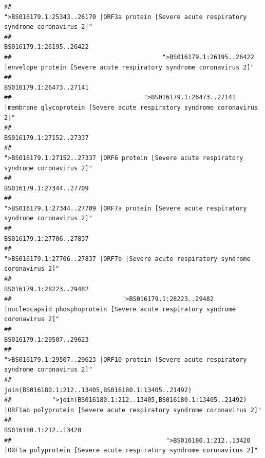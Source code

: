\documentclass[
]{article}
\begin{document}
\begin{verbatim}
##                                            ">BS016179.1:25343..26170 |ORF3a protein [Severe acute respiratory syndrome coronavirus 2]" 
##                                                                                                                BS016179.1:26195..26422 
##                                         ">BS016179.1:26195..26422 |envelope protein [Severe acute respiratory syndrome coronavirus 2]" 
##                                                                                                                BS016179.1:26473..27141 
##                                    ">BS016179.1:26473..27141 |membrane glycoprotein [Severe acute respiratory syndrome coronavirus 2]" 
##                                                                                                                BS016179.1:27152..27337 
##                                             ">BS016179.1:27152..27337 |ORF6 protein [Severe acute respiratory syndrome coronavirus 2]" 
##                                                                                                                BS016179.1:27344..27709 
##                                            ">BS016179.1:27344..27709 |ORF7a protein [Severe acute respiratory syndrome coronavirus 2]" 
##                                                                                                                BS016179.1:27706..27837 
##                                                    ">BS016179.1:27706..27837 |ORF7b [Severe acute respiratory syndrome coronavirus 2]" 
##                                                                                                                BS016179.1:28223..29482 
##                              ">BS016179.1:28223..29482 |nucleocapsid phosphoprotein [Severe acute respiratory syndrome coronavirus 2]" 
##                                                                                                                BS016179.1:29507..29623 
##                                            ">BS016179.1:29507..29623 |ORF10 protein [Severe acute respiratory syndrome coronavirus 2]" 
##                                                                                    join(BS016180.1:212..13405,BS016180.1:13405..21492) 
##           ">join(BS016180.1:212..13405,BS016180.1:13405..21492) |ORF1ab polyprotein [Severe acute respiratory syndrome coronavirus 2]" 
##                                                                                                                  BS016180.1:212..13420 
##                                          ">BS016180.1:212..13420 |ORF1a polyprotein [Severe acute respiratory syndrome coronavirus 2]" 

\end{verbatim}
\end{document}
